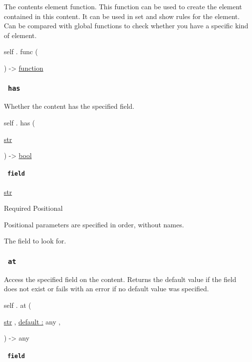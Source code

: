 The content\textquotesingle s element function. This function can be
used to create the element contained in this content. It can be used in
set and show rules for the element. Can be compared with global
functions to check whether you have a specific kind of element.

self { . } { func } (

) -\textgreater{} \href{/docs/reference/foundations/function/}{function}

\subsubsection{\texorpdfstring{\texttt{\ has\ }}{ has }}\label{definitions-has}

Whether the content has the specified field.

self { . } { has } (

{ \href{/docs/reference/foundations/str/}{str} }

) -\textgreater{} \href{/docs/reference/foundations/bool/}{bool}

\paragraph{\texorpdfstring{\texttt{\ field\ }}{ field }}\label{definitions-has-field}

\href{/docs/reference/foundations/str/}{str}

{Required} {{ Positional }}

\label{definitions-has-field-positional-tooltip}
Positional parameters are specified in order, without names.

The field to look for.

\subsubsection{\texorpdfstring{\texttt{\ at\ }}{ at }}\label{definitions-at}

Access the specified field on the content. Returns the default value if
the field does not exist or fails with an error if no default value was
specified.

self { . } { at } (

{ \href{/docs/reference/foundations/str/}{str} , } {
\hyperref[definitions-at-parameters-default]{default :} { any } , }

) -\textgreater{} { any }

\paragraph{\texorpdfstring{\texttt{\ field\ }}{ field }}\label{definitions-at-field}

